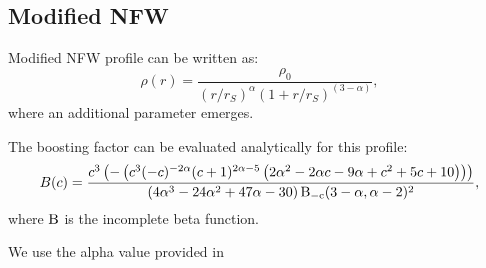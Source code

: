 \subsection{Modified NFW}

Modified NFW profile can be written as:
\begin{equation}
\rho(r) = \dfrac{\rho_0}{(r/r_S)^\alpha(1+r/r_S)^{(3-\alpha)}},
\end{equation}
where an additional parameter \alpha emerges.

The boosting factor can be evaluated analytically for this profile:
\begin{equation}
B(c) = \frac{c^3 \left(-\left(c^3 (-c)^{-2 \alpha} (c+1)^{2 \alpha-5} \left(2 \alpha^2-2 \alpha c-9 \alpha+c^2+5 c+10\right)\right)\right)}{\left(4 \alpha^3-24 \alpha^2+47 \alpha-30\right) \rm{B}_{-c}(3-\alpha,\alpha-2){}^2},
\end{equation}
where $\rm{B}$ is the incomplete beta function.

We use the alpha value provided in \cite{Ishiyama_2014}